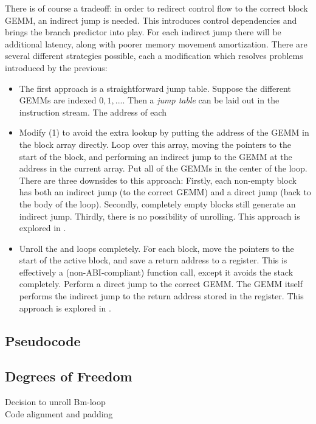 {There is of course a tradeoff: in order to redirect control flow to the correct block GEMM, an indirect jump is needed. This introduces control dependencies and brings the branch predictor into play. For each indirect jump there will be additional latency, along with poorer memory movement amortization. There are several different strategies possible, each a modification which resolves problems introduced by the previous:

\begin{itemize}
  \item The first approach is a straightforward jump table. Suppose the different GEMMs are indexed $0,1,...$. Then a \emph{jump table} can be laid out in the instruction stream. The address of each 


  \item Modify (1) to avoid the extra lookup by putting the address of the GEMM in the block array directly. Loop over this array, moving the  pointers to the start of the block, and performing an indirect jump to the GEMM at the address in the current array. Put all of the GEMMs in the center of the loop. There are three downsides to this approach: Firstly, each non-empty block has both an indirect jump (to the correct GEMM) and a direct jump (back to the body of the loop). Secondly, completely empty blocks still generate an indirect jump. Thirdly, there is no possibility of unrolling. This approach is explored in .

  \item Unroll the  and  loops completely. For each block, move the  pointers to the start of the active block, and save a return address to a register. This is effectively a (non-ABI-compliant) function call, except it avoids the stack completely. Perform a direct jump to the correct GEMM. The GEMM itself performs the indirect jump to the return address stored in the register. This approach is explored in .
\end{itemize}

\subsection{Pseudocode}


\subsection{Degrees of Freedom}
\begin{description}
  \item[Decision to unroll Bm-loop] 
  \item[Code alignment and padding]
\end{description}


}
